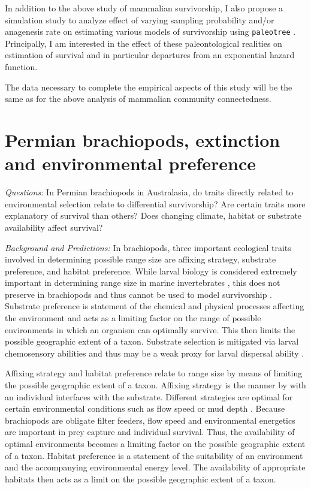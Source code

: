 \documentclass[12pt,letterpaper]{article}
\begin{document}
In addition to the above study of mammalian survivorship, I also propose a simulation study to analyze effect of varying sampling probability and/or anagenesis rate on estimating various models of survivorship using \texttt{paleotree} \citep{Bapst2012a}. Principally, I am interested in the effect of these paleontological realities on estimation of survival and in particular departures from an exponential hazard function. 

The data necessary to complete the empirical aspects of this study will be the same as for the above analysis of mammalian community connectedness.


\section{Permian brachiopods, extinction and environmental preference}

\textit{Questions:} In Permian brachiopods in Australasia, do traits directly related to environmental selection relate to differential survivorship? Are certain traits more explanatory of survival than others? Does changing climate, habitat or substrate availability affect survival?

\textit{Background and Predictions:}
In brachiopods, three important ecological traits involved in determining possible range size are affixing strategy, substrate preference, and habitat preference. While larval biology is considered extremely important in determining range size in marine invertebrates \citep{Jablonski2006a,Jablonski1983}, this does not preserve in brachiopods and thus cannot be used to model survivorship \citep{Jablonski1983}. Substrate preference is statement of the chemical and physical processes affecting the environment and acts as a limiting factor on the range of possible environments in which an organism can optimally survive. This then limits the possible geographic extent of a taxon. Substrate selection is mitigated via larval chemosensory abilities and thus may be a weak proxy for larval dispersal ability \citep{Jablonski2006a,Jablonski1983}. 

Affixing strategy and habitat preference relate to range size by means of limiting the possible geographic extent of a taxon. Affixing strategy is the manner by with an individual interfaces with the substrate. Different strategies are optimal for certain environmental conditions such as flow speed or mud depth \citep{Alexander1977,LaBarbera1978,LaBarbera1981}. Because brachiopods are obligate filter feeders, flow speed and environmental energetics are important in prey capture and individual survival. Thus, the availability of optimal environments becomes a limiting factor on the possible geographic extent of a taxon. Habitat preference is a statement of the suitability of an environment and the accompanying environmental energy level. The availability of appropriate habitats then acts as a limit on the possible geographic extent of a taxon. 
\end{document}
